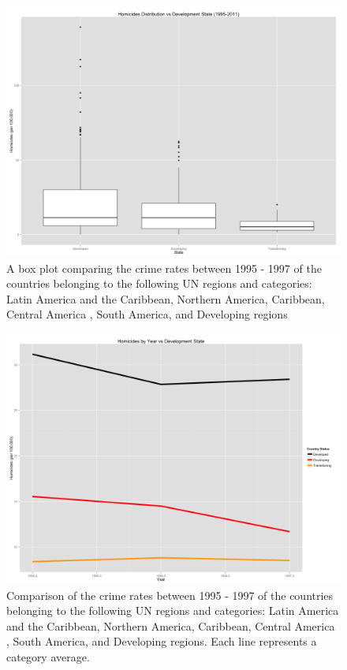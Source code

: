 \documentclass[12pt]{article}
\begin{document}
\begin{figure}[!ht]
    \centering
    \includegraphics[width=7in, keepaspectratio]{supporting_visual_box.png}
    \caption{A box plot comparing the crime rates between 1995 - 1997 of the countries belonging to the following UN regions and categories: Latin America and the Caribbean, Northern America, Caribbean, Central America , South America, and Developing regions}
    \label{fig:sub-box}
\end{figure}

\begin{figure}[!ht]
    \centering
    \includegraphics[width=7in, keepaspectratio]{supporting_visual_line.png}
    \caption{Comparison of the crime rates between 1995 - 1997 of the countries belonging to the following UN regions and categories: Latin America and the Caribbean, Northern America, Caribbean, Central America , South America, and Developing regions. Each line represents a category average.}
    \label{fig:sup-line}
\end{figure}
\end{document}
